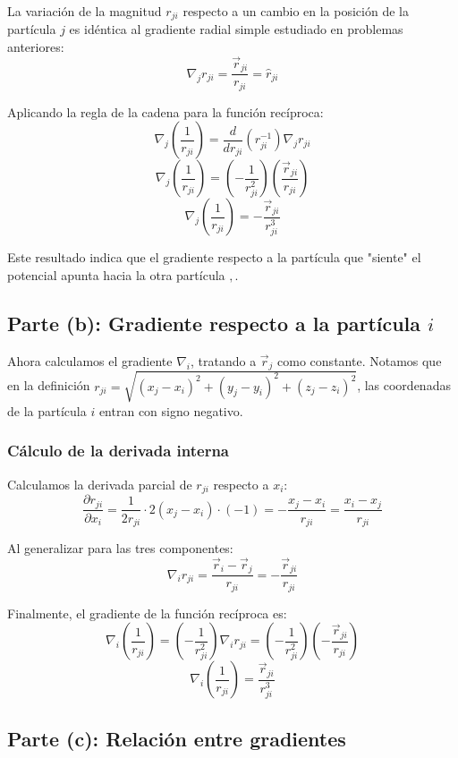\documentclass[a4paper]{article}
\begin{document}
La variación de la magnitud $r_{ji}$ respecto a un cambio en la posición de la partícula $j$ es idéntica al gradiente radial simple estudiado en problemas anteriores:
$$ \nabla_j r_{ji} = \frac{\vec{r}_{ji}}{r_{ji}} = \hat{r}_{ji} $$

Aplicando la regla de la cadena para la función recíproca:
$$ \nabla_j \left( \frac{1}{r_{ji}} \right) = \frac{d}{dr_{ji}} \left( r_{ji}^{-1} \right) \nabla_j r_{ji} $$
$$ \nabla_j \left( \frac{1}{r_{ji}} \right) = \left( -\frac{1}{r_{ji}^2} \right) \left( \frac{\vec{r}_{ji}}{r_{ji}} \right) $$
$$ \nabla_j \left( \frac{1}{r_{ji}} \right) = -\frac{\vec{r}_{ji}}{r_{ji}^3} $$

Este resultado indica que el gradiente respecto a la partícula que "siente" el potencial apunta hacia la otra partícula $,$.

\subsection{Parte (b): Gradiente respecto a la partícula $i$}

Ahora calculamos el gradiente $\nabla_i$, tratando a $\vec{r}_j$ como constante. Notamos que en la definición $r_{ji} = \sqrt{(x_j-x_i)^2 + (y_j-y_i)^2 + (z_j-z_i)^2}$, las coordenadas de la partícula $i$ entran con signo negativo.

\subsubsection{Cálculo de la derivada interna}

Calculamos la derivada parcial de $r_{ji}$ respecto a $x_i$:
$$ \frac{\partial r_{ji}}{\partial x_i} = \frac{1}{2 r_{ji}} \cdot 2(x_j - x_i) \cdot (-1) = -\frac{x_j - x_i}{r_{ji}} = \frac{x_i - x_j}{r_{ji}} $$

Al generalizar para las tres componentes:
$$ \nabla_i r_{ji} = \frac{\vec{r}_i - \vec{r}_j}{r_{ji}} = -\frac{\vec{r}_{ji}}{r_{ji}} $$

Finalmente, el gradiente de la función recíproca es:
$$ \nabla_i \left( \frac{1}{r_{ji}} \right) = \left( -\frac{1}{r_{ji}^2} \right) \nabla_i r_{ji} = \left( -\frac{1}{r_{ji}^2} \right) \left( -\frac{\vec{r}_{ji}}{r_{ji}} \right) $$
$$ \nabla_i \left( \frac{1}{r_{ji}} \right) = \frac{\vec{r}_{ji}}{r_{ji}^3} $$

\subsection{Parte (c): Relación entre gradientes}
\end{document}
